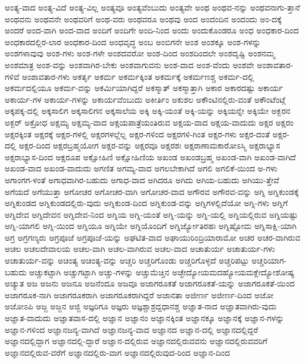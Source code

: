 {ಅಂತ್ಯ-ವಾದ
ಅಂತ್ಯ-ವಿದೆ
ಅಂತ್ಯ-ವಿಲ್ಲ
ಅಂತ್ಯವೂ
ಅಂತ್ಯವೆಂಬುದು
ಅಂತ್ಯವೇ
ಅಂಥ
ಅಂಥವ-ನನ್ನು
ಅಂಥವನಾಗು-ತ್ತಾನೆ
ಅಂಥವನು
ಅಂಥವನೇ
ಅಂಥವರಿಗೆ
ಅಂಥ-ವರು
ಅಂಥವರೂ
ಅಂಥವು
ಅಂದ
ಅಂದಂದಿನ
ಅಂದಂದು
ಅಂ-ದಕ್ಕೆ
ಅಂದರೆ
ಅಂದ-ವಾಗಿ
ಅಂದ-ವಾದ
ಅಂದಿಗೆ
ಅಂದಿಗೇ
ಅಂದಿ-ನಿಂದ
ಅಂದು
ಅಂದುಕೊಂಡರೂ
ಅಂಧ
ಅಂಧಕಾರ-ದಿಂದ
ಅಂಧಕಾರದಲ್ಲಿರ-ಲಾರ
ಅಂಧಕಾರ-ದಿಂದ
ಅಂಧವೃದ್ಧ
ಅಂಬ
ಅಂಬಿಗನೇ
ಅಂಶ
ಅಂಶಕ್ಕೂ
ಅಂಶ-ಗಳನ್ನು
ಅಂಶಗಳಾವುವು
ಅಂಶ-ಗಳು
ಅಂಶ-ಗಳೇ
ಅಂಶದವರೋ
ಅಂಶ-ದಿಂದ
ಅಂಶದಿಂದಲೇ
ಅಂಶದೃಷ್ಟಿ
ಅಂಶನಮ್ಮ
ಅಂಶಮಾತ್ರ
ಅಂಶ-ವನ್ನು
ಅಂಶವಾಗಿರ-ಬೇಕು
ಅಂಶವಾಗುವನು
ಅಂಶ-ವಾದ
ಅಂಶ-ವೆಂದು
ಅಂಶವೇ
ಅಂಶಾವತಾರ-ಗಳಿವೆ
ಅಂಶಾವತಾರ-ಗಳು
ಅಕರ್ತೃ
ಅಕರ್ಮ
ಅಕರ್ಮಕ್ಕಿಂತ
ಅಕರ್ಮಕ್ಕೆ
ಅಕರ್ಮಣಶ್ಚ
ಅಕರ್ಮ-ದಲ್ಲಿ
ಅಕರ್ಮದಲ್ಲಿಯೂ
ಅಕರ್ಮ-ವನ್ನು
ಅಕರ್ಮಿಯಾಗಿದ್ದರೆ
ಅಕಸ್ಮಾತ್
ಅಕಸ್ಮಾತ್ತಾಗಿ
ಅಕಾರ
ಅಕಾರದಷ್ಟು
ಅಕಾರ್ಯ
ಅಕಾರ್ಯ-ಗಳ
ಅಕಾರ್ಯ-ಗಳನ್ನು
ಅಕಾರ್ಯವೆಂಬುದು
ಅಕೀರ್ತಿಂ
ಅಕುಶಲ
ಅಕೌಂಟಿನಲ್ಲಿರು-ವಂತೆ
ಅಕೌಂಟೆಂಟ್ಗೆ
ಅಕ್ಕಪಕ್ಕ-ದಲ್ಲಿ
ಅಕ್ಕಸಾಲಿಗ
ಅಕ್ಕಸಾಲಿಗನ
ಅಕ್ಕಸಾಲೆಯ
ಅಕ್ಕಿ
ಅಕ್ಕಿ-ಯಂತೆ
ಅಕ್ಕಿ-ಯನ್ನು
ಅಕ್ಕಿಯನ್ನೇ
ಅಕ್ಕಿಯೇ
ಅಕ್ಬರನ
ಅಕ್ಬರ್
ಅಕ್ರೋಧ
ಅಕ್ಷಮ್ಯ
ಅಕ್ಷಮ್ಯ-ವಾದ
ಅಕ್ಷಯಪಾತ್ರೆಯಂತಿರುವ
ಅಕ್ಷಯ-ವಾದ
ಅಕ್ಷಯ-ವಾದುದು
ಅಕ್ಷರ
ಅಕ್ಷರಂ
ಅಕ್ಷರಕ್ಕಿಂತ
ಅಕ್ಷರಕ್ಕೆ
ಅಕ್ಷರ-ಗಳಲ್ಲಿ
ಅಕ್ಷರಗಳಲ್ಲೆಲ್ಲ
ಅಕ್ಷರ-ಗಳಿಂದ
ಅಕ್ಷರಗಳಿ-ಗಿಂತ
ಅಕ್ಷರ-ಗಳು
ಅಕ್ಷರ-ದಂತೆ
ಅಕ್ಷರ-ದಲ್ಲಿ
ಅಕ್ಷರ-ದಿಂದ
ಅಕ್ಷರಬ್ರಹ್ಮಯೋಗ
ಅಕ್ಷರ-ವನ್ನು
ಅಕ್ಷರವೂ
ಅಕ್ಷರಶಃ
ಅಕ್ಷರಾಣಾಮಕಾರೋಽಸ್ಮಿ
ಅಕ್ಷರಾಭ್ಯಾಸ
ಅಕ್ಷರಾಭ್ಯಾಸ-ದಿಂದ
ಅಕ್ಷರೂಪ
ಅಕ್ಷೋಹಿಣಿ
ಅಕ್ಷೋಹಿಣಿಯ
ಅಖಂಡ
ಅಖಂಡಬ್ರಹ್ಮ
ಅಖಂಡ-ವಾಗಿ
ಅಖಂಡ-ವಾಗಿದೆ
ಅಖಂಡ-ವಾದ
ಅಖಂಡ-ವಾದುದು
ಅಗಣಿತ
ಅಗಮ್ಯ-ವಾದ
ಅಗಲಬೇಕಾಗಿದೆ
ಅಗಲಿ
ಅಗಲಿಕೆ-ಯಿಂದ
ಅ-ಗಳು
ಅಗಾಂಗಗ-ಳಂತೆ
ಅಗಾಧವಾಗಿರ-ಬಹುದು
ಅಗಾಧ-ವಾದ
ಅಗಿದರೂ
ಅಗಿದು
ಅಗಿಯ-ಬಹುದು
ಅಗಿಯು-ತ್ತೇವೆ
ಅಗೆಯದೆ
ಅಗೆಯುತ್ತಾ
ಅಗೋಚರ
ಅಗೋಚರ-ವಾಗಿ
ಅಗೋಚರ-ವಾದ
ಅಗೌರವ
ಅಗೌರವ-ವನ್ನು
ಅಗ್ನಿ
ಅಗ್ನಿಕುಂಡಕ್ಕೆ
ಅಗ್ನಿಕುಂಡದ
ಅಗ್ನಿಕುಂಡದಲ್ಲಿರು-ವುದು
ಅಗ್ನಿಕುಂಡ-ದಿಂದ
ಅಗ್ನಿಕುಂಡ-ವನ್ನು
ಅಗ್ನಿಗಳಲ್ಲಿದೆಯೋ
ಅಗ್ನಿ-ಗಳು
ಅಗ್ನಿಗೆ
ಅಗ್ನಿದೇವ
ಅಗ್ನಿದೇವನ
ಅಗ್ನಿದೇವ-ನಿಂದ
ಅಗ್ನಿಯ
ಅಗ್ನಿ-ಯಂತೆ
ಅಗ್ನಿ-ಯನ್ನು
ಅಗ್ನಿ-ಯಲ್ಲಿ
ಅಗ್ನಿಯಲ್ಲಿರುವ
ಅಗ್ನಿಯಷ್ಟು
ಅಗ್ನಿ-ಯಾಗಲಿ
ಅಗ್ನಿ-ಯಿಂದ
ಅಗ್ನಿಯೂ
ಅಗ್ನಿಯೇ
ಅಗ್ನಿಯೊಂದಿಗೆ
ಅಗ್ನಿರ್ಜ್ಯೋತಿರಹಃ
ಅಗ್ನಿಷ್ಟೋಮ
ಅಗ್ನಿಸಾಕ್ಷಿ-ಯಾಗಿ
ಅಗ್ರ
ಅಗ್ರಗಣ್ಯರು
ಅಗ್ರಪೂಜೆ
ಅಗ್ರಪೂಜೆ-ಯನ್ನು
ಅಘಟಿತ-ವಾದ
ಅಘಾಯುರಿಂದ್ರಿಯಾರಾಮೋ
ಅಚರ
ಅಚರ-ವಾಗಿರುವ
ಅಚಲ
ಅಚಲದೇವಾಲಯ
ಅಚಲ-ವಾಗಿ
ಅಚಲ-ವಾಗಿರುವ
ಅಚಲ-ವಾದ
ಅಚಾತುರ್ಯ
ಅಚಾತುರ್ಯ-ಗಳು
ಅಚಾತುರ್ಯ-ವನ್ನು
ಅಚಿಂತ್ಯ
ಅಚಿಂತ್ಯ-ವನ್ನು
ಅಚ್ಚರಿ
ಅಚ್ಚರಿಗೊಂಡು
ಅಚ್ಚರಿಗೊಳ್ಳದೆ
ಅಚ್ಚರಿಪಟ್ಟು
ಅಚ್ಚರಿಯಾಗ-ಬಹುದು
ಅಚ್ಚುಕಟ್ಟಾಗಿ
ಅಚ್ಚುಗಟ್ಟಾಗಿ
ಅಚ್ಚು-ಗಳನ್ನು
ಅಚ್ಚುಮೆಚ್ಚಿನ
ಅಚ್ಛೇದ್ಯೋಯಮದಹ್ಯೋಯಮಕ್ಲೇದ್ಯೋಶೋಷ್ಯ
ಅಚ್ಯುತ
ಅಜ
ಅಜನು
ಅಜನೂ
ಅಜನೆಂದೂ
ಅಜವೂ
ಅಜಾಗರೂಕತೆ
ಅಜಾಗರೂಕತೆ-ಯನ್ನು
ಅಜಾಗರೂಕತೆ-ಯಿಂದ
ಅಜಾಗರೂಕ-ನಾಗಿ
ಅಜಾಗರೂಕರಾಗಿ
ಅಜಾಗರೂಕರಾಗಿದ್ದರೆ
ಅಜಾನತಾ
ಅಜೀರ್ಣ
ಅಜೀರ್ಣ-ದಿಂದ
ಅಜೋ
ಅಜೋಽಪಿ
ಅಜ್ಜ
ಅಜ್ಜನ
ಅಜ್ಜಿ
ಅಜ್ಞರಿಗೂ
ಅಜ್ಞರು
ಅಜ್ಞಶ್ಚಾಶ್ರದ್ದಧಾನಶ್ಚ
ಅಜ್ಞಾತ-ನಾದ
ಅಜ್ಞಾತವಾಗಿರು-ವುದು
ಅಜ್ಞಾತ-ವಾದುದು
ಅಜ್ಞಾತವಾಸ-ದಲ್ಲಿ
ಅಜ್ಞಾನ
ಅಜ್ಞಾನಂ
ಅಜ್ಞಾನಕ್ಕಿಂತ
ಅಜ್ಞಾನಕ್ಕೂ
ಅಜ್ಞಾನಕ್ಕೆ
ಅಜ್ಞಾನ-ಗಳನ್ನು
ಅಜ್ಞಾನ-ಗಳಿಂದ
ಅಜ್ಞಾನಜನ್ಯ-ವಾಗಿದೆ
ಅಜ್ಞಾನಜನ್ಯ-ವಾದ
ಅಜ್ಞಾನದ
ಅಜ್ಞಾನ-ದಲ್ಲಿ
ಅಜ್ಞಾನದಲ್ಲಿದ್ದರೆ
ಅಜ್ಞಾನದಲ್ಲಿದ್ದಾಗ
ಅಜ್ಞಾನದಲ್ಲಿ-ದ್ದಾರೆ
ಅಜ್ಞಾನ-ದಲ್ಲಿರುವ
ಅಜ್ಞಾನದಲ್ಲಿರುವವನು
ಅಜ್ಞಾನದಲ್ಲಿರುವವರಿಗೆ
ಅಜ್ಞಾನದಲ್ಲಿರುವ-ವರೆಗೆ
ಅಜ್ಞಾನದಲ್ಲಿರು-ವಾಗ
ಅಜ್ಞಾನದಲ್ಲಿರುವುದ-ರಿಂದ
ಅಜ್ಞಾನ-ದಿಂದ
}
